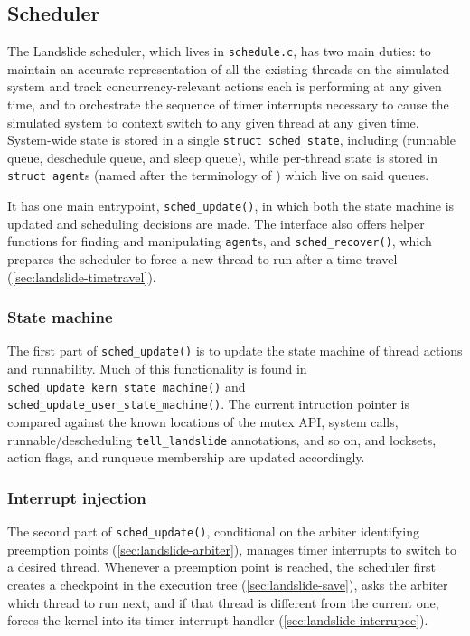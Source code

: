 
\subsection{Scheduler}
\label{sec:landslide-scheduler}

The Landslide scheduler, which lives in {\tt schedule.c}, has two main duties:
to maintain an accurate representation of all the existing threads on the simulated system
and track  concurrency-relevant actions each is performing at any given time,
and to orchestrate the sequence of timer interrupts necessary
to cause the simulated system to context switch to any given thread at any given time.
System-wide state is stored in a single {\tt struct sched\_state},
including 
(runnable queue, deschedule queue, and sleep queue),
while per-thread state is stored in {\tt struct agent}s (named after the terminology of \cite{dbug-ssv}) which live on said queues.

It has one main entrypoint, {\tt sched\_update()}, in which both the state machine is updated and scheduling decisions are made.
The interface also offers helper functions for finding and manipulating {\tt agent}s,
and {\tt sched\_recover()}, which prepares the scheduler to force a new thread to run
after a time travel (\cref{sec:landslide-timetravel}).

\subsubsection{State machine}

The first part of {\tt sched\_update()} is to update the state machine of thread actions and runnability.
Much of this functionality is found in
{\tt sched\_update\_kern\_state\_machine()}
and
{\tt sched\_update\_user\_state\_machine()}.
The current intruction pointer is compared against the known locations of
the mutex API, system calls, runnable/descheduling {\tt tell\_\allowbreak{}landslide} annotations, and so on,
and locksets, action flags, and runqueue membership are updated accordingly.

\subsubsection{Interrupt injection}

The second part of {\tt sched\_update()},
conditional on the arbiter identifying preemption points (\cref{sec:landslide-arbiter}),
manages timer interrupts to switch to a desired thread.
Whenever a preemption point is reached,
the scheduler first creates a checkpoint in the execution tree (\cref{sec:landslide-save}),
asks the arbiter which thread to run next,
and if that thread is different from the current one,
forces the kernel into its timer interrupt handler (\cref{sec:landslide-interrupce}).

